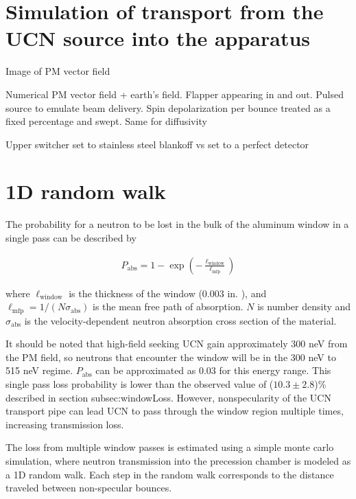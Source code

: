 
\section{Simulation of transport from the UCN source into the apparatus}


Image of PM vector field

Numerical PM vector field + earth's field. Flapper appearing in and out. Pulsed source to emulate beam delivery. Spin depolarization per bounce treated as a fixed percentage and swept. Same for diffusivity

Upper switcher set to stainless steel blankoff vs set to a perfect detector



\section{1D random walk}\label{sec:1D_random_walk}


The probability for a neutron to be lost in the bulk of the aluminum window in a single pass can be described by

\begin{gather}
   P_\text{abs} = 1 - \exp \left( - \frac{\ell_\text{window} }{ \ell_\text{mfp} } \right)
\end{gather}

where $\ell_\text{window}$ is the thickness of the window (0.003 in. ), and $\ell_\text{mfp} = 1 / (N\sigma_\text{abs})$ is the mean free path of absorption. $N$ is number density and $\sigma_\text{abs}$ is the velocity-dependent neutron absorption cross section of the material. 

It should be noted that high-field seeking UCN gain approximately 300 neV from the PM field, so neutrons that encounter the window will be in the 300 neV to 515 neV regime. $P_\text{abs}$ can be approximated as 0.03 for this energy range. This single pass loss probability is lower than the observed value of ($10.3\pm 2.8$)\% described in section subsec:windowLoss. However, nonspecularity of the UCN transport pipe can lead UCN to pass through the window region multiple times, increasing transmission loss. 

The loss from multiple window passes is estimated using a simple monte carlo simulation, where neutron transmission into the precession chamber is modeled as a 1D random walk. Each step in the random walk corresponds to the distance traveled between non-specular bounces. 

